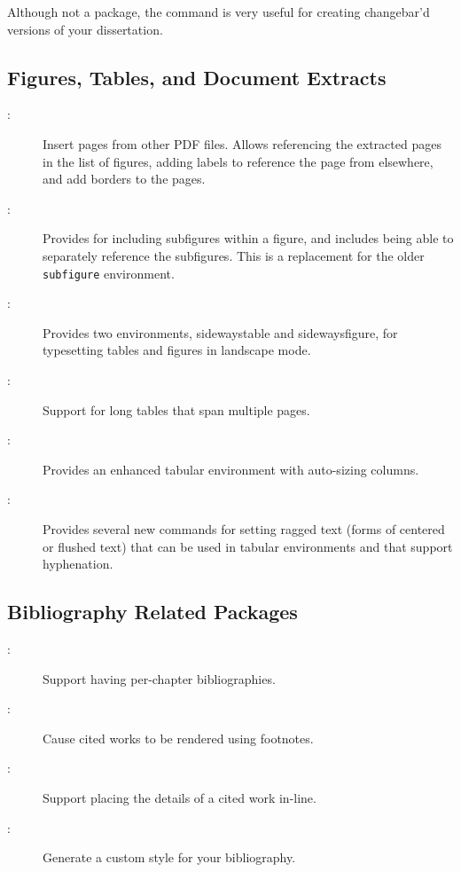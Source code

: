 Although not a package, the
command is very useful for creating changebar'd versions of your
dissertation.


\subsection{Figures, Tables, and Document Extracts}

\begin{description}
\item[:]
    Insert pages from other PDF files.  Allows referencing the extracted
    pages in the list of figures, adding labels to reference the page
    from elsewhere, and add borders to the pages.

\item[:]
    Provides for including subfigures within a figure, and includes
    being able to separately reference the subfigures.  This is a
    replacement for the older \texttt{subfigure} environment.

\item[:]
    Provides two environments, sidewaystable and sidewaysfigure,
    for typesetting tables and figures in landscape mode.  

\item[:]
    Support for long tables that span multiple pages.

\item[:]
    Provides an enhanced tabular environment with auto-sizing columns.

\item[:]
    Provides several new commands for setting ragged text (\eg forms
    of centered or flushed text) that can be used in tabular
    environments and that support hyphenation.

\end{description}


\subsection{Bibliography Related Packages}

\begin{description}
\item[:]
    Support having per-chapter bibliographies.

\item[:]
    Cause cited works to be rendered using footnotes.

\item[:] 
    Support placing the details of a cited work in-line.

\item[:]
    Generate a custom style for your bibliography.

\end{description}


